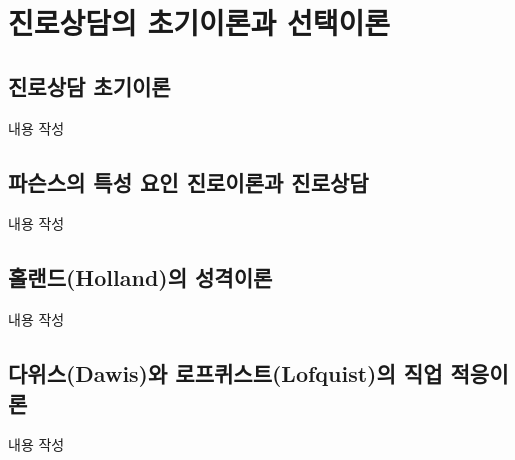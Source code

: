 \section{진로상담의 초기이론과 선택이론}

\subsection{진로상담 초기이론}
내용 작성

\subsection{파슨스의 특성 요인 진로이론과 진로상담}
내용 작성

\subsection{홀랜드(Holland)의 성격이론}
내용 작성

\subsection{다위스(Dawis)와 로프퀴스트(Lofquist)의 직업 적응이론}
내용 작성
